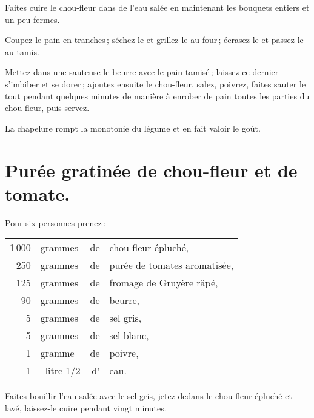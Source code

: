 Faites cuire le chou-fleur dans de l'eau salée en maintenant les bouquets entiers
et un peu fermes.

Coupez le pain en tranches ; séchez-le et grillez-le au four ; écrasez-le et
passez-le au tamis.

Mettez dans une sauteuse le beurre avec le pain tamisé ; laissez ce dernier
s'imbiber et se dorer ; ajoutez ensuite le chou-fleur, salez, poivrez, faites
sauter le tout pendant quelques minutes de manière à enrober de pain toutes les
parties du chou-fleur, puis servez.

La chapelure rompt la monotonie du légume et en fait valoir le goût.

\section*{\centering Purée gratinée de chou-fleur et de tomate.}
{}

Pour six personnes prenez :

\footnotesize
\begin{longtable}{rlrp{16em}}
  1 000 & grammes  & de & chou-fleur épluché,                                                             \\
    250 & grammes  & de & purée de tomates aromatisée,                                                    \\
    125 & grammes  & de & fromage de Gruyère räpé,                                                        \\
     90 & grammes  & de & beurre,                                                                         \\
      5 & grammes  & de & sel gris,                                                                       \\
      5 & grammes  & de & sel blanc,                                                                      \\
      1 & gramme   & de & poivre,                                                                         \\
     1 & litre 1/2 & d' & eau.                                                                            \\
\end{longtable}
\normalsize

Faites bouillir l'eau salée avec le sel gris, jetez dedans le chou-fleur épluché et
lavé, laissez-le cuire pendant vingt minutes.

